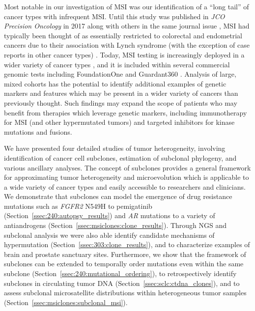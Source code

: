 Most notable in our investigation of MSI was our identification of a ``long tail'' of cancer types with infrequent MSI. Until this study \cite{bonneville2017} was published in \textit{JCO Precision Oncology} in 2017 along with others in the same journal issue \cite{middha2017,kok2017,klempner2017,haraldsdottir2017}, MSI had typically been thought of as essentially restricted to colorectal and endometrial cancers due to their association with Lynch syndrome (with the exception of case reports in other cancer types) \cite{lynch2015}. Today, MSI testing is increasingly deployed in a wider variety of cancer types \cite{eldeiry2019}, and it is included within several commercial genomic tests including FoundationOne \cite{trabucco2019} and Guardant360 \cite{willis2019}. Analysis of large, mixed cohorts has the potential to identify additional examples of genetic markers and features which may be present in a wider variety of cancers than previously thought. Such findings may expand the scope of patients who may benefit from therapies which leverage genetic markers, including immunotherapy for MSI (and other hypermutated tumors) and targeted inhibitors for kinase mutations and fusions.

We have presented four detailed studies of tumor heterogeneity, involving identification of cancer cell subclones, estimation of subclonal phylogeny, and various ancillary analyses. The concept of subclones provides a general framework for approximating tumor heterogeneity and microevolution which is applicable to a wide variety of cancer types and easily accessible to researchers and clinicians. We demonstrate that subclones can model the emergence of drug resistance mutations such as \textit{FGFR2} N549H to pemigatinib (Section~\ref{ssec:240:autopsy_results}) and \textit{AR} mutations to a variety of antiandrogens (Section~\ref{ssec:msiclones:clone_results}). Through NGS and subclonal analysis we were also able identify candidate mechanisms of hypermutation (Section~\ref{ssec:303:clone_results}), and to characterize examples of brain and prostate sanctuary sites. Furthermore, we show that the framework of subclones can be extended to temporally order mutations even within the same subclone (Section~\ref{ssec:240:mutational_ordering}), to retrospectively identify subclones in circulating tumor DNA (Section~\ref{ssec:sclc:ctdna_clones}), and to assess subclonal microsatellite distributions within heterogeneous tumor samples (Section~\ref{ssec:msiclones:subclonal_msi}).

